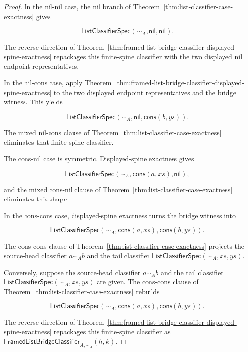 \begin{proof}
In the nil-nil case, the nil branch of
Theorem~\ref{thm:list-classifier-case-exactness} gives

$$
\mathsf{ListClassifierSpec}(\sim_A,\mathsf{nil},\mathsf{nil}).
$$

The reverse direction of
Theorem~\ref{thm:framed-list-bridge-classifier-displayed-spine-exactness}
repackages this finite-spine classifier with the two displayed nil endpoint
representatives.

In the nil-cons case, apply
Theorem~\ref{thm:framed-list-bridge-classifier-displayed-spine-exactness} to the
two displayed endpoint representatives and the bridge witness. This yields

$$
\mathsf{ListClassifierSpec}(\sim_A,\mathsf{nil},\mathsf{cons}(b,ys)).
$$

The mixed nil-cons clause of Theorem~\ref{thm:list-classifier-case-exactness}
eliminates that finite-spine classifier.

The cons-nil case is symmetric. Displayed-spine exactness gives

$$
\mathsf{ListClassifierSpec}(\sim_A,\mathsf{cons}(a,xs),\mathsf{nil}),
$$

and the mixed cons-nil clause of
Theorem~\ref{thm:list-classifier-case-exactness} eliminates this shape.

In the cons-cons case, displayed-spine exactness turns the bridge witness into

$$
\mathsf{ListClassifierSpec}(\sim_A,\mathsf{cons}(a,xs),\mathsf{cons}(b,ys)).
$$

The cons-cons clause of Theorem~\ref{thm:list-classifier-case-exactness}
projects the source-head classifier $a\sim_A b$ and the tail classifier
$\mathsf{ListClassifierSpec}(\sim_A,xs,ys)$.

Conversely, suppose the source-head classifier $a\sim_A b$ and the tail
classifier $\mathsf{ListClassifierSpec}(\sim_A,xs,ys)$ are given. The cons-cons
clause of Theorem~\ref{thm:list-classifier-case-exactness} rebuilds

$$
\mathsf{ListClassifierSpec}(\sim_A,\mathsf{cons}(a,xs),\mathsf{cons}(b,ys)).
$$

The reverse direction of
Theorem~\ref{thm:framed-list-bridge-classifier-displayed-spine-exactness}
repackages this finite-spine classifier as
$\mathsf{FramedListBridgeClassifier}_{A,\sim_A}(h,k)$.
\end{proof}

